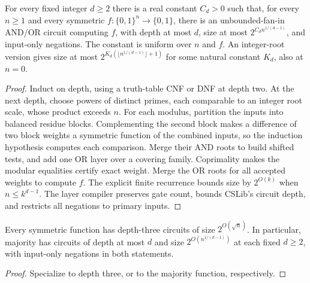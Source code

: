 \begin{theorem}
  \label{thm:circuits-shallow-symmetric}
  \leanok
  For every fixed integer $d\ge2$ there is a real constant $C_d>0$ such
  that, for every $n\ge1$ and every symmetric $f:\{0,1\}^n\to\{0,1\}$,
  there is an unbounded-fan-in AND/OR circuit computing $f$, with depth at
  most $d$, size at most $2^{C_d n^{1/(d-1)}}$, and input-only negations.
  The constant is uniform over $n$ and $f$. An integer-root version gives
  size at most $2^{K_d(\lfloor n^{1/(d-1)}\rfloor+1)}$ for some natural
  constant $K_d$, also at $n=0$.
\end{theorem}
\begin{proof}
  \leanok
  Induct on depth, using a truth-table CNF or DNF at depth two. At the next
  depth, choose powers of distinct primes, each comparable to an integer
  root scale, whose product exceeds $n$. For each modulus, partition the
  inputs into balanced residue blocks. Complementing the second block
  makes a difference of two block weights a symmetric function of the
  combined inputs, so the induction hypothesis computes each comparison.
  Merge their AND roots to build shifted tests, and add one OR layer over
  a covering family. Coprimality makes the modular equalities certify exact
  weight. Merge the OR roots for all accepted weights to compute $f$.
  The explicit finite recurrence bounds size by $2^{O(k)}$ when
  $n\le k^{d-1}$. The layer compiler preserves gate count, bounds CSLib's
  circuit depth, and restricts all negations to primary inputs.
\end{proof}

\begin{corollary}
  \label{cor:circuits-shallow-majority}
  \leanok
  Every symmetric function has depth-three circuits of size
  $2^{O(\sqrt n)}$. In particular, majority has circuits of depth at most
  $d$ and size $2^{O(n^{1/(d-1)})}$ at each fixed $d\ge2$, with input-only
  negations in both statements.
\end{corollary}
\begin{proof}
  \leanok
  Specialize to depth three, or to the majority function, respectively.
\end{proof}

